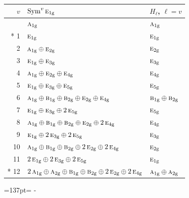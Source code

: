 \documentclass[10pt,a4paper]{article}
\newcommand{\needspace}[1]{\par\penalty-100\begingroup\dimen0=#1\relax\dimen2=\pagegoal
  \advance\dimen2-\pagetotal\ifdim\dimen0>\dimen2\relax\ifdim\dimen2>0pt\vfil\break\fi\fi
  \endgroup}
\numberwithin{equation}{section}
\newcommand{\irr}[1]{\text{\normalfont\scshape #1}}
\newcommand{\ptag}[1]{\mathrm{#1}}
\begin{document}
{\small\begin{longtable}{@{}rll@{}}\toprule
$v$ & $\operatorname{Sym}^{v}\irr{e}_{1\ptag{g}}$ & $H_\ell$, $\ell = v$\\\midrule\endhead
\bottomrule\endfoot\endlastfoot
0 & $\irr{a}_{1\ptag{g}}$ & $\irr{a}_{1\ptag{g}}$\\*
1 & $\irr{e}_{1\ptag{g}}$ & $\irr{e}_{1\ptag{g}}$\\
2 & $\irr{a}_{1\ptag{g}} \oplus \irr{e}_{2\ptag{g}}$ & $\irr{e}_{2\ptag{g}}$\\
3 & $\irr{e}_{1\ptag{g}} \oplus \irr{e}_{3\ptag{g}}$ & $\irr{e}_{3\ptag{g}}$\\
4 & $\irr{a}_{1\ptag{g}} \oplus \irr{e}_{2\ptag{g}} \oplus \irr{e}_{4\ptag{g}}$ & $\irr{e}_{4\ptag{g}}$\\
5 & $\irr{e}_{1\ptag{g}} \oplus \irr{e}_{3\ptag{g}} \oplus \irr{e}_{5\ptag{g}}$ & $\irr{e}_{5\ptag{g}}$\\
6 & $\irr{a}_{1\ptag{g}} \oplus \irr{b}_{1\ptag{g}} \oplus \irr{b}_{2\ptag{g}} \oplus \irr{e}_{2\ptag{g}} \oplus \irr{e}_{4\ptag{g}}$ & $\irr{b}_{1\ptag{g}} \oplus \irr{b}_{2\ptag{g}}$\\
7 & $\irr{e}_{1\ptag{g}} \oplus \irr{e}_{3\ptag{g}} \oplus 2\,\irr{e}_{5\ptag{g}}$ & $\irr{e}_{5\ptag{g}}$\\
8 & $\irr{a}_{1\ptag{g}} \oplus \irr{b}_{1\ptag{g}} \oplus \irr{b}_{2\ptag{g}} \oplus \irr{e}_{2\ptag{g}} \oplus 2\,\irr{e}_{4\ptag{g}}$ & $\irr{e}_{4\ptag{g}}$\\
9 & $\irr{e}_{1\ptag{g}} \oplus 2\,\irr{e}_{3\ptag{g}} \oplus 2\,\irr{e}_{5\ptag{g}}$ & $\irr{e}_{3\ptag{g}}$\\
10 & $\irr{a}_{1\ptag{g}} \oplus \irr{b}_{1\ptag{g}} \oplus \irr{b}_{2\ptag{g}} \oplus 2\,\irr{e}_{2\ptag{g}} \oplus 2\,\irr{e}_{4\ptag{g}}$ & $\irr{e}_{2\ptag{g}}$\\
11 & $2\,\irr{e}_{1\ptag{g}} \oplus 2\,\irr{e}_{3\ptag{g}} \oplus 2\,\irr{e}_{5\ptag{g}}$ & $\irr{e}_{1\ptag{g}}$\\*
12 & $2\,\irr{a}_{1\ptag{g}} \oplus \irr{a}_{2\ptag{g}} \oplus \irr{b}_{1\ptag{g}} \oplus \irr{b}_{2\ptag{g}} \oplus 2\,\irr{e}_{2\ptag{g}} \oplus 2\,\irr{e}_{4\ptag{g}}$ & $\irr{a}_{1\ptag{g}} \oplus \irr{a}_{2\ptag{g}}$\\
\bottomrule\end{longtable}}
\needspace{137pt}
\end{document}
